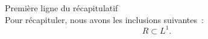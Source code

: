 Première ligne du récapitulatif\\[0.2em]
Pour récapituler, nous avons les inclusions suivantes~: %
\[
  R \subset L^1.
\]
